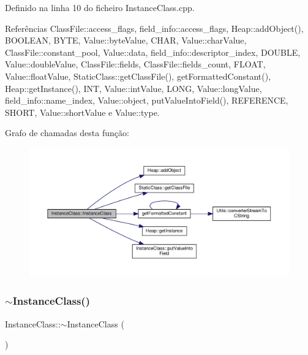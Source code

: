 Definido na linha 10 do ficheiro Instance\+Class.\+cpp.



Referências Class\+File\+::access\+\_\+flags, field\+\_\+info\+::access\+\_\+flags, Heap\+::add\+Object(), B\+O\+O\+L\+E\+AN, B\+Y\+TE, Value\+::byte\+Value, C\+H\+AR, Value\+::char\+Value, Class\+File\+::constant\+\_\+pool, Value\+::data, field\+\_\+info\+::descriptor\+\_\+index, D\+O\+U\+B\+LE, Value\+::double\+Value, Class\+File\+::fields, Class\+File\+::fields\+\_\+count, F\+L\+O\+AT, Value\+::float\+Value, Static\+Class\+::get\+Class\+File(), get\+Formatted\+Constant(), Heap\+::get\+Instance(), I\+NT, Value\+::int\+Value, L\+O\+NG, Value\+::long\+Value, field\+\_\+info\+::name\+\_\+index, Value\+::object, put\+Value\+Into\+Field(), R\+E\+F\+E\+R\+E\+N\+CE, S\+H\+O\+RT, Value\+::short\+Value e Value\+::type.

Grafo de chamadas desta função\+:
\nopagebreak
\begin{figure}[H]
\begin{center}
\leavevmode
\includegraphics[width=350pt]{classInstanceClass_a86ab031eb0f0240b0a54423003000322_cgraph}
\end{center}
\end{figure}
\mbox{\label{classInstanceClass_a441cc692dedc481373b7e670fab72556}} 
\subsubsection{\texorpdfstring{$\sim$\+Instance\+Class()}{~InstanceClass()}}
{\footnotesize\ttfamily Instance\+Class\+::$\sim$\+Instance\+Class (\begin{DoxyParamCaption}{ }\end{DoxyParamCaption})}



